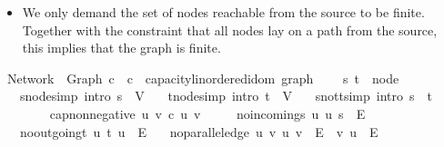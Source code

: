 \begin{isabellebody}
\begin{isamarkuptext}
\begin{itemize}
\item We only demand the set of nodes reachable from the source to be finite.
Together with the constraint that all nodes lay on a path from the source,
this implies that the graph is finite.%
\end{itemize}%
\end{isamarkuptext}\isamarkuptrue%
\isamarkupfalse%
\ Network\ {\isacharequal}\ Graph\ c\ \ c\ {\isacharcolon}{\isacharcolon}\ {\isachardoublequoteopen}{\isacharprime}capacity{\isacharcolon}{\isacharcolon}linordered{\isacharunderscore}idom\ graph{\isachardoublequoteclose}\ {\isacharplus}\isanewline
\ \ \ s\ t\ {\isacharcolon}{\isacharcolon}\ node\isanewline
\ \ \ s{\isacharunderscore}node{\isacharbrackleft}simp{\isacharcomma}\ intro{\isacharbang}{\isacharbrackright}{\isacharcolon}\ {\isachardoublequoteopen}s\ {\isasymin}\ V{\isachardoublequoteclose}\isanewline
\ \ \ t{\isacharunderscore}node{\isacharbrackleft}simp{\isacharcomma}\ intro{\isacharbang}{\isacharbrackright}{\isacharcolon}\ {\isachardoublequoteopen}t\ {\isasymin}\ V{\isachardoublequoteclose}\isanewline
\ \ \ s{\isacharunderscore}not{\isacharunderscore}t{\isacharbrackleft}simp{\isacharcomma}\ intro{\isacharbang}{\isacharbrackright}{\isacharcolon}\ {\isachardoublequoteopen}s\ {\isasymnoteq}\ t{\isachardoublequoteclose}\isanewline
\ \ \ \ \isanewline
\ \ \ cap{\isacharunderscore}non{\isacharunderscore}negative{\isacharcolon}\ {\isachardoublequoteopen}{\isasymforall}u\ v{\isachardot}\ c\ {\isacharparenleft}u{\isacharcomma}\ v{\isacharparenright}\ {\isasymge}\ {}{\isachardoublequoteclose}\isanewline
\ \ \ no{\isacharunderscore}incoming{\isacharunderscore}s{\isacharcolon}\ {\isachardoublequoteopen}{\isasymforall}u{\isachardot}\ {\isacharparenleft}u{\isacharcomma}\ s{\isacharparenright}\ {\isasymnotin}\ E{\isachardoublequoteclose}\isanewline
\ \ \ no{\isacharunderscore}outgoing{\isacharunderscore}t{\isacharcolon}\ {\isachardoublequoteopen}{\isasymforall}u{\isachardot}\ {\isacharparenleft}t{\isacharcomma}\ u{\isacharparenright}\ {\isasymnotin}\ E{\isachardoublequoteclose}\isanewline
\ \ \ no{\isacharunderscore}parallel{\isacharunderscore}edge{\isacharcolon}\ {\isachardoublequoteopen}{\isasymforall}u\ v{\isachardot}\ {\isacharparenleft}u{\isacharcomma}\ v{\isacharparenright}\ {\isasymin}\ E\ {\isasymlongrightarrow}\ {\isacharparenleft}v{\isacharcomma}\ u{\isacharparenright}\ {\isasymnotin}\ E{\isachardoublequoteclose}\isanewline

\end{isabellebody}

